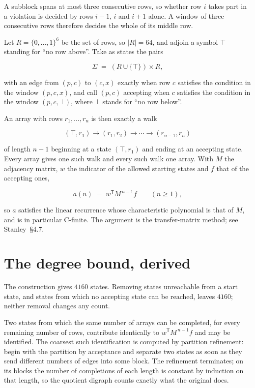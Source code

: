 \documentclass[11pt]{article}
\theoremstyle{definition}
\begin{document}
A subblock spans at most three consecutive rows, so whether row $i$ takes part in a violation is decided by rows $i-1$, $i$ and $i+1$ alone. A window of three consecutive rows therefore decides the whole of its middle row.

Let $R = \{0,\dots,1\}^{6}$ be the set of rows, so $|R| = 64$, and adjoin a symbol $\top$ standing for ``no row above''. Take as states the pairs

\[\Sigma \;=\; (R \cup \{\top\}) \times R,\]

with an edge from $(p,c)$ to $(c,x)$ exactly when row $c$ satisfies the condition in the window $(p,c,x)$, and call $(p,c)$ accepting when $c$ satisfies the condition in the window $(p,c,\bot)$, where $\bot$ stands for ``no row below''.

An array with rows $r_1,\dots,r_n$ is then exactly a walk

\[(\top,r_1) \to (r_1,r_2) \to \cdots \to (r_{n-1},r_n)\]

of length $n-1$ beginning at a state $(\top,r_1)$ and ending at an accepting state. Every array gives one such walk and every such walk one array. With $M$ the adjacency matrix, $w$ the indicator of the allowed starting states and $f$ that of the accepting ones,

\[a(n) \;=\; w^{\mathsf T} M^{\,n-1} f \qquad (n \ge 1),\]

so $a$ satisfies the linear recurrence whose characteristic polynomial is that of $M$, and is in particular C-finite. The argument is the transfer-matrix method; see Stanley~\S4.7.

\section{The degree bound, derived}

The construction gives $4160$ states. Removing states unreachable from a start state, and states from which no accepting state can be reached, leaves $4160$; neither removal changes any count.

Two states from which the same number of arrays can be completed, for every remaining number of rows, contribute identically to $w^{\mathsf T}M^{\,n-1}f$ and may be identified. The coarsest such identification is computed by partition refinement: begin with the partition by acceptance and separate two states as soon as they send different numbers of edges into some block. The refinement terminates; on its blocks the number of completions of each length is constant by induction on that length, so the quotient digraph counts exactly what the original does.
\end{document}
